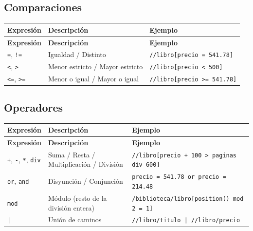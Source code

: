 \documentclass[a4paper, 8pt]{extarticle}
\begin{document}
\subsection*{Comparaciones}

\begin{longtable}{@{} p{4cm} p{7cm} p{6.5cm} @{}}
\toprule
\textbf{Expresión} & \textbf{Descripción} & \textbf{Ejemplo} \\
\midrule
\endfirsthead
\toprule
\textbf{Expresión} & \textbf{Descripción} & \textbf{Ejemplo} \\
\midrule
\endhead
\bottomrule
\endfoot
\bottomrule
\endlastfoot

\centering \verb!=!, \verb|!=|  & Igualdad / Distinto            & \verb!//libro[precio = 541.78]!  \\
\centering \verb!<!, \verb!>!  & Menor estricto / Mayor estricto & \verb!//libro[precio < 500]!     \\
\centering \verb!<=!, \verb!>=! & Menor o igual / Mayor o igual  & \verb!//libro[precio >= 541.78]! \\
\end{longtable}

\subsection*{Operadores}

\begin{longtable}{@{} p{4cm} p{7cm} p{6.5cm} @{}}
\toprule
\textbf{Expresión} & \textbf{Descripción} & \textbf{Ejemplo} \\
\midrule
\endfirsthead
\toprule
\textbf{Expresión} & \textbf{Descripción} & \textbf{Ejemplo} \\
\midrule
\endhead
\bottomrule
\endfoot
\bottomrule
\endlastfoot

\centering \verb!+!, \verb!-!, \verb!*!, \verb!div! & Suma / Resta / Multiplicación / División & \verb!//libro[precio + 100 > paginas div 600]! \\
\centering \verb!or!, \verb!and!                    & Disyunción / Conjunción                  & \verb!precio = 541.78 or precio = 214.48!      \\
\centering \verb!mod!                               & Módulo (resto de la división entera)     & \verb!/biblioteca/libro[position() mod 2 = 1]! \\
\centering \verb!|!                                 & Unión de caminos                         & \verb!//libro/titulo | //libro/precio!         \\
\end{longtable}
\end{document}
